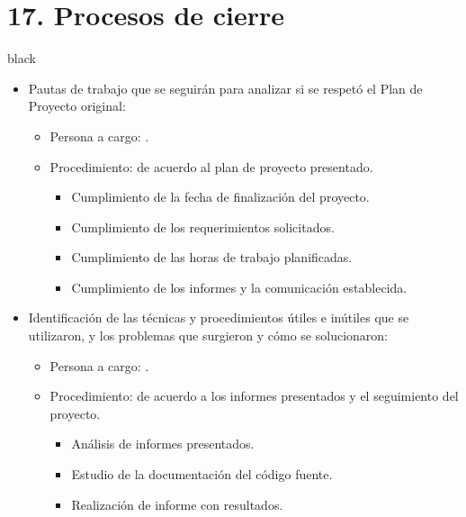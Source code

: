 \documentclass[11pt]{charter}
\begin{document}
\section{17. Procesos de cierre}    
\label{sec:cierre}
\begin{consigna}{black}
\begin{itemize}
\item Pautas de trabajo que se seguirán para analizar si se respetó el Plan de Proyecto original:
\begin{itemize}
 \item Persona a cargo: \authorname. 
 \end{itemize}
 \begin{itemize}
 \item Procedimiento: de acuerdo al plan de proyecto presentado.
 \begin{itemize}
  \item Cumplimiento de la fecha de finalización del proyecto.
  \item Cumplimiento de los requerimientos solicitados.
  \item Cumplimiento de las horas de trabajo planificadas.
   \item Cumplimiento de los informes y la comunicación establecida.
  \end{itemize}
 \end{itemize}
 
\item Identificación de las técnicas y procedimientos útiles e inútiles que se utilizaron, y los problemas que surgieron y cómo se solucionaron:

 \begin{itemize}
 \item Persona a cargo: \authorname. 
 \end{itemize}
 
 \begin{itemize}
 \item Procedimiento: de acuerdo a los informes presentados y el seguimiento del proyecto.
 \begin{itemize}
  \item Análisis de informes presentados.
  \item Estudio de la documentación del código fuente.
  \item Realización de informe con resultados.
  \end{itemize}
 \end{itemize}
 
 
 

\end{itemize}
\end{consigna}
\end{document}
